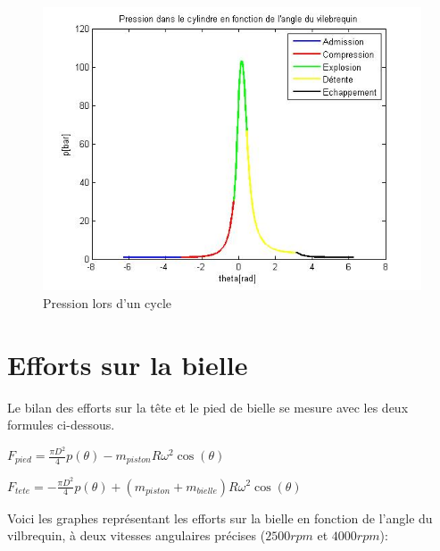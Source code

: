 \documentclass[a4paper,oneside,12pt]{report}
\begin{document}
\begin{figure}[H]
	\center
	\includegraphics[scale=0.75]{pression.jpg}
	\caption{Pression lors d'un cycle}
\end{figure}

\section{Efforts sur la bielle}

Le bilan des efforts sur la tête et le pied de bielle se mesure avec les deux formules ci-dessous. 

\begin{center}
$F_{pied} = \frac{\pi D^2}{4}p(\theta) -  m_{piston}R\omega^2 \cos(\theta)  $ \\
\end{center}
\begin{center}
$F_{tete} = -\frac{\pi D^2}{4}p(\theta) +  (m_{piston}+m_{bielle})R\omega^2 \cos(\theta)$ 
\end{center}

Voici les graphes représentant les efforts sur la bielle en fonction de l'angle du vilbrequin, à deux vitesses angulaires précises ($2500rpm$ et $4000rpm$):
\end{document}

